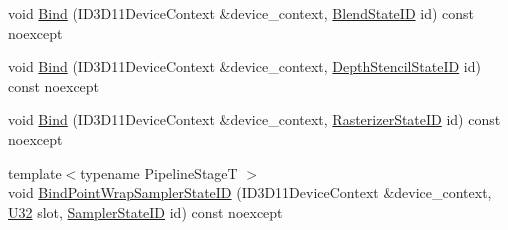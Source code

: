 \begin{DoxyCompactItemize}
void \mbox{\hyperlink{classmage_1_1rendering_1_1_state_manager_aee24b65a57f9c47c4c74e509884d1978}{Bind}} (I\+D3\+D11\+Device\+Context \&device\+\_\+context, \mbox{\hyperlink{namespacemage_1_1rendering_abdf11cdb816b9208aec6c3a81f7564ab}{Blend\+State\+ID}} id) const noexcept
\item 
void \mbox{\hyperlink{classmage_1_1rendering_1_1_state_manager_a0ae3054764b68d9e9c89c403b57b52b3}{Bind}} (I\+D3\+D11\+Device\+Context \&device\+\_\+context, \mbox{\hyperlink{namespacemage_1_1rendering_ace195e7a068336e477080fce30f1329e}{Depth\+Stencil\+State\+ID}} id) const noexcept
\item 
void \mbox{\hyperlink{classmage_1_1rendering_1_1_state_manager_a4b3f51dfa639bdb218e9103df4342638}{Bind}} (I\+D3\+D11\+Device\+Context \&device\+\_\+context, \mbox{\hyperlink{namespacemage_1_1rendering_ac878731f5dc22a3a36ccfbfc77c3faca}{Rasterizer\+State\+ID}} id) const noexcept
\item 
{\footnotesize template$<$typename Pipeline\+StageT $>$ }\\void \mbox{\hyperlink{classmage_1_1rendering_1_1_state_manager_a6771451495ed6d83c76e6f008b2d7c17}{Bind\+Point\+Wrap\+Sampler\+State\+ID}} (I\+D3\+D11\+Device\+Context \&device\+\_\+context, \mbox{\hyperlink{namespacemage_a41c104c036fba3756a74e19f793eeaa1}{U32}} slot, \mbox{\hyperlink{namespacemage_1_1rendering_a6f80181126db61dbb8b528a6894eb658}{Sampler\+State\+ID}} id) const noexcept
\end{DoxyCompactItemize}
